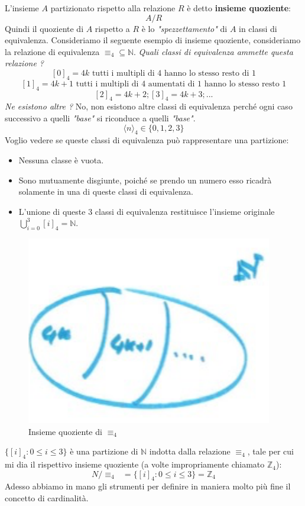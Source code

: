 \documentclass{article}
\begin{document}
L'insieme $A$ partizionato rispetto alla relazione $R$ è detto \textbf{insieme quoziente}:
$$A / R$$
Quindi il quoziente di $A$ rispetto a $R$ è lo \textit{"spezzettamento"} di $A$ in classi
di equivalenza.
Consideriamo il seguente esempio di insieme quoziente, consideriamo la relazione di equivalenza $\equiv_4\subseteq\mathbb{N}$.
\textit{Quali classi di equivalenza ammette questa relazione ?}
$$[0]_4={4k}\text{ tutti i multipli di 4 hanno lo stesso resto di 1}$$
$$[1]_4={4k+1}\text{ tutti i multipli di 4 aumentati di 1 hanno lo stesso resto 1}$$
$$[2]_4={4k+2}; [3]_4={4k+3};...$$
\textit{Ne esistono altre ?} No, non esistono altre classi di equivalenza perché
ogni caso successivo a quelli \textit{"base"} si riconduce a quelli \textit{"base"}.
$$\langle n\rangle_4\in\{0,1,2,3\}$$
Voglio vedere se queste classi di equivalenza può rappresentare una partizione:
\begin{itemize}
    \item Nessuna classe è vuota.
    \item Sono mutuamente disgiunte, poiché se prendo un numero esso ricadrà
          solamente in una di queste classi di equivalenza.
    \item L'unione di queste $3$ classi di equivalenza restituisce l'insieme originale
          $\bigcup\limits_{i=0}^3 [i]_4=\mathbb{N}$.
\end{itemize}
\begin{figure}[H]
    \centering
    \includegraphics[scale=0.4]{images/rel_equi_quot.png}
    \caption{Insieme quoziente di $\equiv_4$}
\end{figure}

$\{[i]_4 : 0\leq i\leq 3\}$ è una partizione di $\mathbb{N}$ indotta dalla relazione
$\equiv_4$, tale per cui mi dia il rispettivo insieme quoziente (a volte impropriamente
chiamato $\mathbb{Z}_4$):
$$N / \equiv_4 \text{ }=\{[i]_4 : 0\leq i\leq 3\}=\mathbb{Z}_4$$
Adesso abbiamo in mano gli strumenti per definire in maniera molto più fine il concetto
di cardinalità.
\end{document}
